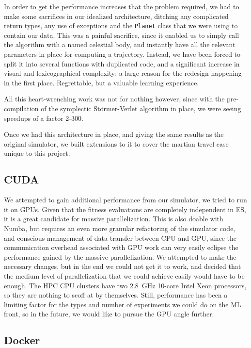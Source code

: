 In order to get the performance increases that the problem required, we had to make some sacrifices in our idealized architecture, ditching any complicated return types, any use of exceptions and the \texttt{Planet} class that we were using to contain our data. This was a painful sacrifice, since it enabled us to simply call the algorithm with a named celestial body, and instantly have all the relevant parameters in place for computing a trajectory. Instead, we have been forced to split it into several functions with duplicated code, and a significant increase in visual and lexicographical complexity; a large reason for the redesign happening in the first place. Regrettable, but a valuable learning experience.

All this heart-wrenching work was not for nothing however, since with the pre-compilation of the symplectic Störmer-Verlet algorithm in place, we were seeing speedups of a factor 2-300. 

Once we had this architecture in place, and giving the same results as the original simulator, we built extensions to it to cover the martian travel case unique to this project.

\subsection{CUDA}

We attempted to gain additional performance from our simulator, we tried to run it on GPUs. Given that the fitness evaluations are completely independent in ES, it is a great candidate for massive parallelization. This is also doable with Numba, but requires an even more granular refactoring of the simulator code, and conscious management of data transfer between CPU and GPU, since the communication overhead associated with GPU work can very easily eclipse the performance gained by the massive parallelization. We attempted to make the necessary changes, but in the end we could not get it to work, and decided that the medium level of parallelization that we could achieve easily would have to be enough. The HPC CPU clusters have two \SI{2.8}{\GHz} 10-core Intel Xeon processors, so they are nothing to scoff at by themselves. Still, performance has been a limiting factor for the types and number of experiments we could do on the ML front, so in the future, we would like to pursue the GPU angle further.

\subsection{Docker}


